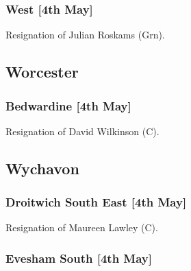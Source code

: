 \documentclass[a4paper,openany]{book}
\begin{document}
\begin{resultsiii}
\subsubsection*{West \hspace*{\fill}\nolinebreak[1]%
\enspace\hspace*{\fill}
[4th May]}


Resignation of Julian Roskams (Grn).

\subsection*{Worcester}

\subsubsection*{Bedwardine \hspace*{\fill}\nolinebreak[1]%
\enspace\hspace*{\fill}
[4th May]}


Resignation of David Wilkinson (C).

\subsection*{Wychavon}

\subsubsection*{Droitwich South East \hspace*{\fill}\nolinebreak[1]%
\enspace\hspace*{\fill}
[4th May]}


Resignation of Maureen Lawley (C).

\subsubsection*{Evesham South \hspace*{\fill}\nolinebreak[1]%
\enspace\hspace*{\fill}
[4th May]}



\end{resultsiii}
\end{document}
